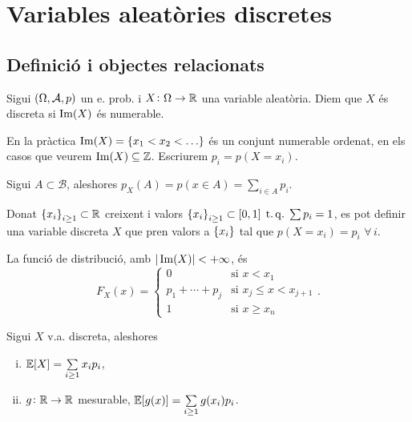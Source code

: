 \chapter{Variables aleatòries discretes}

\section[Definició i objectes relacionats]
    {Definició i objectes relacionats
    }

\begin{defi}
    Sigui $\left( \Omega, \mathcal{A}, p\right)$ un e. prob. i $X\colon \Omega\to\mathbb{R}$ una variable aleatòria. Diem que $X$ és discreta si
    $\operatorname{Im}(X)$ és numerable.
\end{defi}

\begin{obs}
    En la pràctica $\im(X) = \lc x_1 < x_2 < \dots \rc$ és un conjunt numerable ordenat, en els casos que veurem $\operatorname{Im}(X)\subseteq\mathbb{Z}$.
    Escriurem $p_i = p(X=x_i)$.
\end{obs}

\begin{obs}
    Sigui $A\subset\mathcal{B}$, aleshores $p_X(A) = p(x\in A) = \sum_{i\in A}{p_i}$.
\end{obs}

\begin{obs}
    Donat $\left\{ x_i \right\}_{i \ge 1} \subset\mathbb{R}$ creixent i valors $\left\{ x_i \right\}_{i \ge 1} \subset [0,1] \operatorname{\;t.q.\;} \sum{p_i}=1$, es pot definir
    una variable discreta $X$ que pren valors a $\left\{ x_i \right\}$ tal que $p(X=x_i) = p_i$ $\forall\,i$.
\end{obs}

\begin{obs}
    La funció de distribució, amb $|\operatorname{Im}(X)|<+\infty$, és
    \[F_X(x) = \begin{cases}
        0 &\text{si } x<x_1\\
        p_1+\cdots+p_j &\text{si } x_j \le x < x_{j+1}\\
        1 &\text{si } x \ge x_n
    \end{cases}.\]
\end{obs}

\begin{prop} Sigui $X$ v.a. discreta, aleshores
    \begin{enumerate}[i)]
        \item $\operatorname{\mathbb{E}}[X] = \sum\limits_{i \ge 1}{x_i p_i}$,
        \item $g\colon \mathbb{R}\to\mathbb{R}$ mesurable, $\operatorname{\mathbb{E}}[g(x)] = \sum\limits_{i \ge 1}{g(x_i) p_i}$.
    \end{enumerate}
\end{prop}


